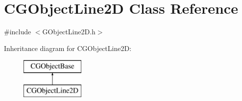 \hypertarget{class_c_g_object_line2_d}{}\section{C\+G\+Object\+Line2\+D Class Reference}
\label{class_c_g_object_line2_d}


{\ttfamily \#include $<$G\+Object\+Line2\+D.\+h$>$}

Inheritance diagram for C\+G\+Object\+Line2\+D\+:\begin{figure}[H]
\begin{center}
\leavevmode
\includegraphics[height=2.000000cm]{class_c_g_object_line2_d}
\end{center}
\end{figure}
